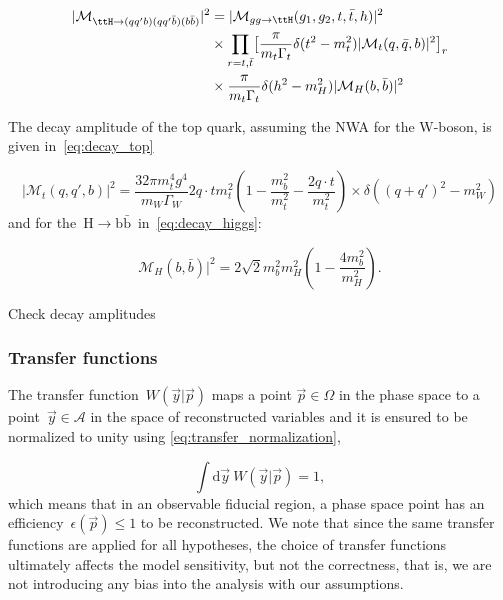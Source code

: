 \begin{align}
\label{eq:scattering_nwa}
|\mathcal{M}_{\ttH \rightarrow (qq'b) (qq'\bar{b}) (b\bar{b})}|^2 &= |\mathcal{M}_{gg \rightarrow \ttH}(g_1, g_2, t, \bar{t}, h)|^2 \\
&\times \prod_{r = t,\bar{t}} \bigl[ \frac{\pi}{m_t \Gamma_t} \delta(t^2 - m_t^2) |\mathcal{M}_t(q,\bar{q},b)|^2 \bigr]_r \\
&\times \frac{\pi}{m_t \Gamma_t} \delta(h^2 - m_H^2) |\mathcal{M}_H(b,\bar{b})|^2
\end{align}

The decay amplitude of the top quark, assuming the NWA for the W-boson, is given in~\cref{eq:decay_top}

\begin{equation}
\label{eq:decay_top}
|\mathcal{M}_t(q,q',b)|^2 = \frac{32\pi m_t^4 g^4}{m_W \Gamma_W} {2 q\cdot t}{m_t^2} (1 - \frac{m_b^2}{m_t^2} - \frac{2 q \cdot t}{m_t^2}) \times \delta((q+q')^2 - m_W^2)
\end{equation}
and for the~$\mathrm{H} \rightarrow \mathrm{b}\bar{\mathrm{b}}$~in~\cref{eq:decay_higgs}:

\begin{equation}
\label{eq:decay_higgs}
\mathcal{M}_H(b,\bar{b})|^2 = 2\sqrt{2} m_b^2 m_H^2 (1 - \frac{4m_b^2}{m_H^2}).
\end{equation}

\fix Check decay amplitudes

\subsubsection{Transfer functions}
\label{sec:transfer_functions}

The transfer function~$W(\vec{y} | \vec{p})$ maps a point $\vec{p} \in \Omega$ in the phase space to a point~$\vec{y} \in \mathcal{A}$ in the space of reconstructed variables and it is ensured to be normalized to unity using \cref{eq:transfer_normalization},

\begin{equation}
\label{eq:transfer_normalization}
\int \mathrm{d}\vec{y}~W(\vec{y} | \vec{p}) = 1,
\end{equation}
which means that in an observable fiducial region, a phase space point has an efficiency~$\epsilon(\vec{p}) \leq 1$ to be reconstructed. We note that since the same transfer functions are applied for all hypotheses, the choice of transfer functions ultimately affects the model sensitivity, but not the correctness, that is, we are not introducing any bias into the analysis with our assumptions.

